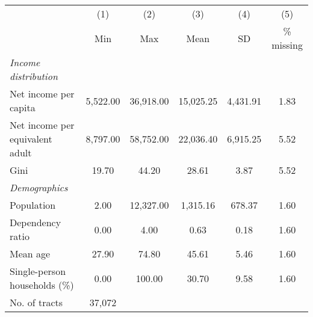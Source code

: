 
\begin{tabular}{@{}lccccc@{}}
\toprule
  & (1) & (2) & (3) &  (4) &  (5) \\
 & Min & Max & Mean & SD & \% missing\\
\midrule
\qquad \textit{Income distribution} \\
Net income per capita &  5,522.00 & 36,918.00 & 15,025.25 &  4,431.91 &      1.83\\
Net income per equivalent adult &  8,797.00 & 58,752.00 & 22,036.40 &  6,915.25 &      5.52\\
Gini &     19.70 &     44.20 &     28.61 &      3.87 &      5.52\\
\qquad \textit{Demographics} \\
Population &      2.00 & 12,327.00 &  1,315.16 &    678.37 &      1.60\\
Dependency ratio &      0.00 &      4.00 &      0.63 &      0.18 &      1.60\\
Mean age &     27.90 &     74.80 &     45.61 &      5.46 &      1.60\\
Single-person households (\%) &      0.00 &    100.00 &     30.70 &      9.58 &      1.60\\
\midrule
No. of tracts &          37,072 \\
\midrule
\end{tabular}